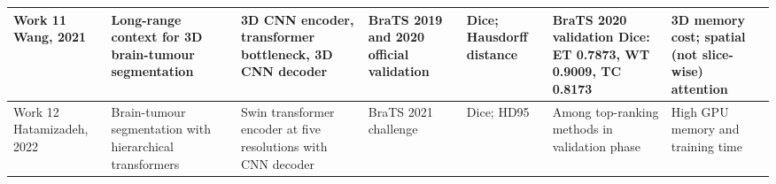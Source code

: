 \begin{landscape}
\begin{longtable}{|p{2.2cm}|p{2.6cm}|p{3.6cm}|p{2.7cm}|p{2.6cm}|p{3.2cm}|p{3.2cm}|}
Work 11 \cite{wang2021transbts} Wang, 2021 & Long-range context for 3D brain-tumour segmentation & 3D CNN encoder, transformer bottleneck, 3D CNN decoder & BraTS 2019 and 2020 official validation & Dice; Hausdorff distance & BraTS 2020 validation Dice: ET 0.7873, WT 0.9009, TC 0.8173 & 3D memory cost; spatial (not slice-wise) attention\\\hline
Work 12 \cite{hatamizadeh2022swin} Hatamizadeh, 2022 & Brain-tumour segmentation with hierarchical transformers & Swin transformer encoder at five resolutions with CNN decoder & BraTS 2021 challenge & Dice; HD95 & Among top-ranking methods in validation phase & High GPU memory and training time\\\hline
\end{longtable}\endgroup\end{landscape}
